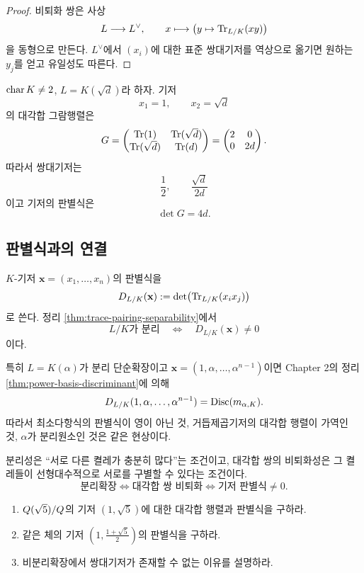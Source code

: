 \begin{proof}
비퇴화 쌍은 사상
\[
  L\longrightarrow L^\vee,
  \qquad
  x\longmapsto\bigl(y\mapsto\operatorname{Tr}_{L/K}(xy)\bigr)
\]
을 동형으로 만든다. $L^\vee$에서 $(x_i)$에 대한 표준 쌍대기저를
역상으로 옮기면 원하는 $y_j$를 얻고 유일성도 따른다.
\end{proof}

\begin{example}
$\operatorname{char} K\ne2$, $L=K(\sqrt d)$라 하자. 기저
\[
  x_1=1,\qquad x_2=\sqrt d
\]
의 대각합 그람행렬은
\[
  G=
  \begin{pmatrix}
    \operatorname{Tr}(1)&\operatorname{Tr}(\sqrt d)\\
    \operatorname{Tr}(\sqrt d)&\operatorname{Tr}(d)
  \end{pmatrix}
  =
  \begin{pmatrix}
    2&0\\
    0&2d
  \end{pmatrix}.
\]
따라서 쌍대기저는
\[
  \boxed{
  \frac12,\qquad
  \frac{\sqrt d}{2d}}
\]
이고 기저의 판별식은
\[
  \det G=4d.
\]
\end{example}

\subsection{판별식과의 연결}

$K$-기저 $\mathbf x=(x_1,\dots,x_n)$의 판별식을
\[
  D_{L/K}(\mathbf x)
  :=\det\bigl(\operatorname{Tr}_{L/K}(x_ix_j)\bigr)
\]
로 쓴다. 정리 \ref{thm:trace-pairing-separability}에서
\[
  L/K\text{가 분리}
  \quad\Longleftrightarrow\quad
  D_{L/K}(\mathbf x)\ne0
\]
이다.

특히 $L=K(\alpha)$가 분리 단순확장이고
$\mathbf x=(1,\alpha,\dots,\alpha^{n-1})$이면 Chapter 2의
정리 \ref{thm:power-basis-discriminant}에 의해
\[
  D_{L/K}(1,\alpha,\dots,\alpha^{n-1})
  =\operatorname{Disc}(m_{\alpha,K}).
\]
따라서 최소다항식의 판별식이 영이 아닌 것, 거듭제곱기저의
대각합 행렬이 가역인 것, $\alpha$가 분리원소인 것은 같은 현상이다.

\begin{keyidea}
분리성은 ``서로 다른 켤레가 충분히 많다''는 조건이고,
대각합 쌍의 비퇴화성은 그 켤레들이 선형대수적으로 서로를 구별할 수 있다는 조건이다.
\[
  \boxed{
  \text{분리확장}
  \Longleftrightarrow
  \text{대각합 쌍 비퇴화}
  \Longleftrightarrow
  \text{기저 판별식}\ne0.}
\]
\end{keyidea}

\begin{checkpoint}
\begin{enumerate}[label=(\alph*)]
  \item $Q(\sqrt5)/Q$의 기저
  $(1,\sqrt5)$에 대한 대각합 행렬과 판별식을 구하라.
  \item 같은 체의 기저
  $\left(1,\frac{1+\sqrt5}{2}\right)$의 판별식을 구하라.
  \item 비분리확장에서 쌍대기저가 존재할 수 없는 이유를 설명하라.
\end{enumerate}
\end{checkpoint}
